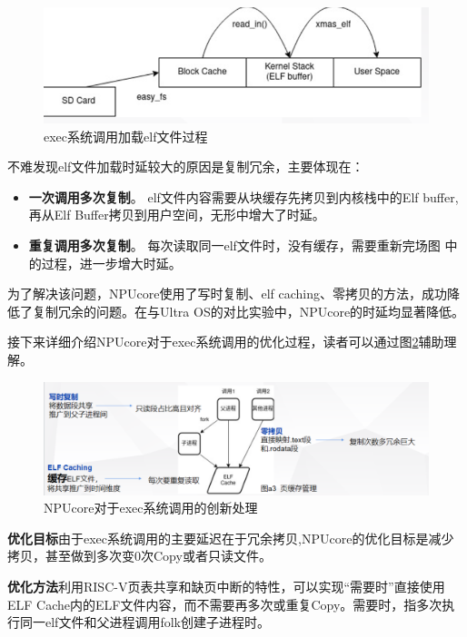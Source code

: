 \begin{figure}[htbp]
	\centering
	\includegraphics[scale=0.75]{figures/10-04/10-04-exec系统调用加载elf文件过程.png}
	\caption{exec系统调用加载elf文件过程}
	\label{exam-2}
\end{figure}

不难发现elf文件加载时延较大的原因是复制冗余，主要体现在：
\begin{itemize}
	\item \textbf{一次调用多次复制}。 elf文件内容需要从块缓存先拷贝到内核栈中的Elf buffer,再从Elf Buffer拷贝到用户空间，无形中增大了时延。
	
	\item \textbf{重复调用多次复制}。 每次读取同一elf文件时，没有缓存，需要重新完场图 中的过程，进一步增大时延。
\end{itemize}

为了解决该问题，NPUcore使用了写时复制、elf caching、零拷贝的方法，成功降低了复制冗余的问题。在与Ultra OS的对比实验中，NPUcore的时延均显著降低。

接下来详细介绍NPUcore对于exec系统调用的优化过程，读者可以通过图\ref{exam-3}辅助理解。

\begin{figure}[htbp]
	\centering
	\includegraphics[scale=0.5]{figures/10-04/10-04-NPUcore对于exec系统调用的创新处理.png}
	\caption{NPUcore对于exec系统调用的创新处理}
	\label{exam-3}
\end{figure}

\textbf{优化目标}\;由于exec系统调用的主要延迟在于冗余拷贝,NPUcore的优化目标是减少拷贝，甚至做到多次变0次Copy或者只读文件。

\textbf{优化方法}\;利用RISC-V页表共享和缺页中断的特性，可以实现“需要时”直接使用ELF Cache内的ELF文件内容，而不需要再多次或重复Copy。需要时，指多次执行同一elf文件和父进程调用folk创建子进程时。

